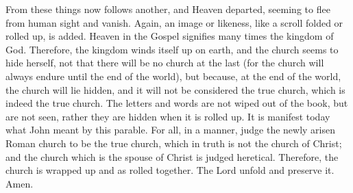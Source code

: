From these things now follows another, and Heaven departed, seeming to flee from human sight and vanish. Again, an image or likeness, like a scroll folded or rolled up, is added. Heaven in the Gospel signifies many times the kingdom of God. Therefore, the kingdom winds itself up on earth, and the church seems to hide herself, not that there will be no church at the last (for the church will always endure until the end of the world), but because, at the end of the world, the church will lie hidden, and it will not be considered the true church, which is indeed the true church. The letters and words are not wiped out of the book, but are not seen, rather they are hidden when it is rolled up. It is manifest today what John meant by this parable. For all, in a manner, judge the newly arisen Roman church to be the true church, which in truth is not the church of Christ; and the church which is the spouse of Christ is judged heretical. Therefore, the church is wrapped up and as rolled together. The Lord unfold and preserve it. Amen.
